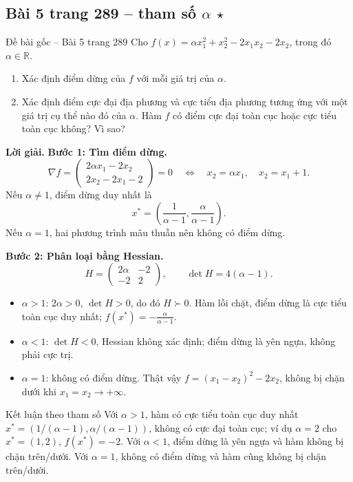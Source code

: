 \documentclass[11pt,a4paper]{article}
\newcommand{\R}{\mathbb{R}}
\newcommand{\grad}{\nabla}
\begin{document}
\clearpage
\subsection{Bài 5 trang 289 -- tham số \(\alpha\) \(\star\)}
\begin{questionbox}{Đề bài gốc -- Bài 5 trang 289}
Cho \(f(x)=\alpha x_1^2+x_2^2-2x_1x_2-2x_2\), trong đó \(\alpha\in\R\).
\begin{enumerate}[label=\roman*),nosep,leftmargin=*]
\item Xác định điểm dừng của \(f\) với mỗi giá trị của \(\alpha\).
\item Xác định điểm cực đại địa phương và cực tiểu địa phương tương ứng với một giá trị cụ thể nào đó của \(\alpha\). Hàm \(f\) có điểm cực đại toàn cục hoặc cực tiểu toàn cục không? Vì sao?
\end{enumerate}
\end{questionbox}
\textbf{Lời giải.} \textbf{Bước 1: Tìm điểm dừng.}
\[
\grad f=
\begin{pmatrix}2\alpha x_1-2x_2\\2x_2-2x_1-2\end{pmatrix}=0
\quad\Longleftrightarrow\quad
x_2=\alpha x_1,\quad x_2=x_1+1.
\]
Nếu \(\alpha\ne1\), điểm dừng duy nhất là
\[
x^\ast=\left(\frac1{\alpha-1},\frac{\alpha}{\alpha-1}\right).
\]
Nếu \(\alpha=1\), hai phương trình mâu thuẫn nên không có điểm dừng.

\textbf{Bước 2: Phân loại bằng Hessian.}
\[
H=\begin{pmatrix}2\alpha&-2\\-2&2\end{pmatrix},
\qquad \det H=4(\alpha-1).
\]
\begin{itemize}
\item \(\alpha>1\): \(2\alpha>0\), \(\det H>0\), do đó \(H\succ0\). Hàm lồi chặt, điểm dừng là cực tiểu toàn cục duy nhất; \(f(x^\ast)=-\frac{\alpha}{\alpha-1}\).
\item \(\alpha<1\): \(\det H<0\), Hessian không xác định; điểm dừng là yên ngựa, không phải cực trị.
\item \(\alpha=1\): không có điểm dừng. Thật vậy \(f=(x_1-x_2)^2-2x_2\), không bị chặn dưới khi \(x_1=x_2\to+\infty\).
\end{itemize}

\begin{answerbox}{Kết luận theo tham số}
Với \(\alpha>1\), hàm có cực tiểu toàn cục duy nhất \(x^\ast=(1/(\alpha-1),\alpha/(\alpha-1))\), không có cực đại toàn cục; ví dụ \(\alpha=2\) cho \(x^\ast=(1,2)\), \(f(x^\ast)=-2\). Với \(\alpha<1\), điểm dừng là yên ngựa và hàm không bị chặn trên/dưới. Với \(\alpha=1\), không có điểm dừng và hàm cũng không bị chặn trên/dưới.
\end{answerbox}
\end{document}
